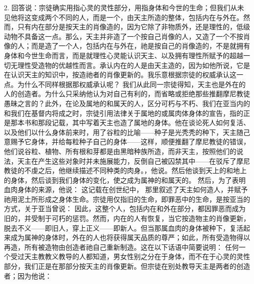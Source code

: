 2. 回答说：宗徒确实用指心灵的灵性部分，用指身体和今世的生命；但我们从未见他将这变成两个不同的人，而是一个，由天主所造的整体，包括内在与外在。然而，只有内在部分是按天主的肖像造的，因为它除了非物质外，还是理性的，低级动物不具备这一点。那么，天主并非造了一个按自己肖像的人，又造了一个不按肖像的人；而是造了一个人，包括内在与外在，祂是按自己的肖像造的，不是就拥有身体和今世生命而言，而是就理性心灵能认识天主、以及拥有理性所赋予的超越一切无理性受造物的优越性而言。承认内在的人是由天主造的，因为如他所说，它是在认识天主的知识中，按造祂者的肖像更新的。我乐意根据宗徒的权威承认这一点。为什么不同样根据那权威承认呢？ 我们从此同一宗徒得知，天主也是外在的人的创造者。为什么只采纳他认为对自己有利的，而省略或拒绝那些推翻摩尼教徒愚昧之言的？此外，在论及属地的和属天的人，区分可朽与不朽、我们在亚当内的和我们在基督内将成之时，宗徒引用法律关于属地的或属肉体身体的宣告，指的正是那本书和那段记载，其中写着天主也造了属地的身体。他在谈论死人如何复活、以及他们以什么身体前来时，用了谷粒的比喻——种子是光秃秃的种下，天主随己意赐予它身体，并给每粒种子自己的身体——这样，顺便推翻了摩尼教徒的错误，他们说谷粒、植物、所有根和芽都是由黑暗种族所造，而非天主，按照他们的说法，天主在产生这些对象时并未施展能力，反倒自己被囚禁其中——在驳斥了摩尼教徒的不虔之后，他继续描述不同种类的肉身。，他说。然后他谈到天上的和地上的身体，然后谈到我们身体的变化，使之成为属神的和属天的。 然后，为了表明血肉身体的来源，他说：  这记载在创世纪中， 那里叙述了天主如何造人，并赋予祂用泥土所形成之身体生命。宗徒用仅指旧的生命，即罪恶中的生命，是按亚当的方式，关于亚当曾说：  因此，这整个人，包括内在和外在部分，都因罪恶而成为旧的，并受制于可朽的惩罚。然而，内在的人有恢复，当它按造物主的肖像更新，脱去不义——即旧人，穿上正义——即新人。但当那属血肉的身体被种下，复活起来成为属神的身体时，外在的人也将获得属天品质的尊严；如此，所有受造物得以再造，所有被造物由创造者祂自己重新制造。这在以下话语中简要说明：  任何一个受过天主教教义教导的人都知道，男女性别之分在于身体，而不在于心灵的灵性部分，我们正是在那部分按天主的肖像更新。但宗徒在别处教导天主是两者的创造者；因为他说：  